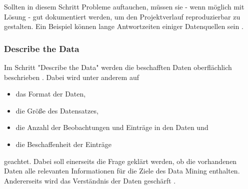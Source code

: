 Sollten in diesem Schritt Probleme auftauchen, müssen sie - wenn möglich mit Lösung - gut dokumentiert werden, um den Projektverlauf reproduzierbar zu gestalten. Ein Beispiel können lange Antwortzeiten einiger Datenquellen sein \citep[S.~15]{shearer_crisp-dm_2000}.

\subsubsection{Describe the Data}
Im Schritt "Describe the Data" werden die beschafften Daten oberflächlich beschrieben \citep[S.~18]{chapman_crisp-dm_2000}. Dabei wird unter anderem auf 
\begin{itemize}
\item das Format der Daten,
\item die Größe des Datensatzes,
\item die Anzahl der Beobachtungen und Einträge in den Daten und 
\item die Beschaffenheit der Einträge
\end{itemize}
geachtet. Dabei soll einerseits die Frage geklärt werden, ob die vorhandenen Daten alle relevanten Informationen für die Ziele des Data Mining enthalten. Andererseits wird das Verständnis der Daten geschärft \citep[S.~15]{shearer_crisp-dm_2000}.

